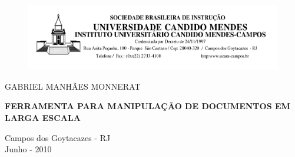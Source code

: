 \thispagestyle{empty}

\begin{spacing}{1.0}

\begin{center}
\begin{figure}[!htb]
    \includegraphics[scale=0.3, bb=0 0 1500 400]{ucam.png}
\end{figure}
\end{center}

\vspace {2 cm}
\begin{center}
\begin{normalsize}
\uppercase{
Gabriel Manhães Monnerat
}
\end{normalsize}
\end{center}
\vspace {2 cm}
\begin{spacing}{1.5}
\begin{center}
\begin{Large}
{\bf \uppercase{Ferramenta para manipulação de documentos em larga escala}
}
\end{Large}

\end{center}
\end{spacing}

\vspace {5 cm}

\begin{center}

\begin{large}
Campos dos Goytacazes - RJ \\[0.2 cm]
Junho - 2010
\end{large}
\end{center}

\end{spacing}
\newpage